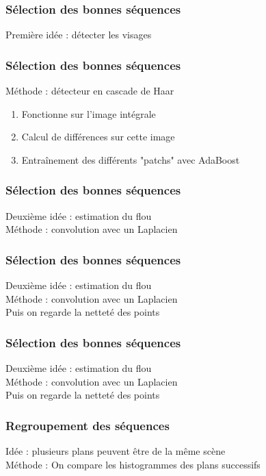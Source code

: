 \begin{frame}
\frametitle{Sélection des bonnes séquences}
Première idée : détecter les visages

\end{frame}

\begin{frame}
\frametitle{Sélection des bonnes séquences}
Méthode : détecteur en cascade de Haar
\begin{enumerate}
\item Fonctionne sur l'image intégrale
\item Calcul de différences sur cette image
\item Entraînement des différents "patchs" avec AdaBoost

\end{enumerate}

\end{frame}

\begin{frame}
\frametitle{Sélection des bonnes séquences}
Deuxième idée : estimation du flou \\
Méthode : convolution avec un Laplacien
\end{frame}

\begin{frame}
\frametitle{Sélection des bonnes séquences}
Deuxième idée : estimation du flou \\
Méthode : convolution avec un Laplacien \\
Puis on regarde la netteté des points

\end{frame}

\begin{frame}
\frametitle{Sélection des bonnes séquences}
Deuxième idée : estimation du flou \\
Méthode : convolution avec un Laplacien \\
Puis on regarde la netteté des points

\end{frame}
\begin{frame}
\frametitle{Regroupement des séquences}
Idée : plusieurs plans peuvent être de la même scène \\
Méthode : On compare les histogrammes des plans successifs
\end{frame}


